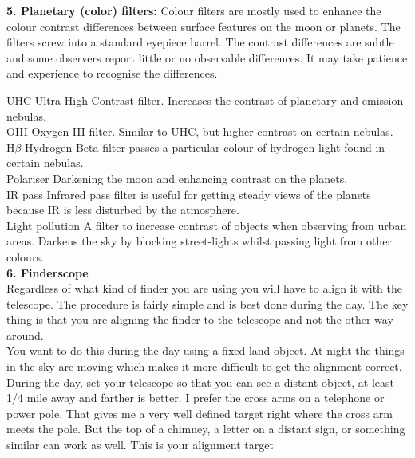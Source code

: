 \documentclass[a4paper,12pt]{extarticle}
\begin{document}
\textsf{\textbf{5. Planetary (color) filters:}} Colour filters are mostly used to enhance the colour contrast differences between surface features on the moon or planets. The filters screw into a standard eyepiece barrel. The contrast differences are subtle and some observers report little or no observable differences. It may take patience and experience to recognise the differences.

{\color{blue} UHC} \quad Ultra High Contrast filter. Increases the contrast of planetary and emission nebulas.\\
{\color{blue} OIII} \quad Oxygen-III filter. Similar to UHC, but higher contrast on certain nebulas.\\
{\color{blue} H$\beta$} \quad Hydrogen Beta filter passes a particular colour of hydrogen light found in certain nebulas.\\
{\color{blue} Polariser} \quad Darkening the moon and enhancing contrast on the planets.\\
{\color{blue} IR pass} \quad Infrared pass filter is useful for getting steady views of the planets because IR is less disturbed by the atmosphere.\\
{\color{blue} Light pollution} \quad A filter to increase contrast of objects when observing from
urban areas. Darkens the sky by blocking street-lights whilst passing light from other colours.\\

\textbf{6. Finderscope}\\

Regardless of what kind of finder you are using you will have to align it with the telescope. The procedure is fairly simple and is best done during the day. The key thing is that you are aligning the finder to the telescope and not the other way around.\\

You want to do this during the day using a fixed land object. At night the things in the sky are moving which makes it more difficult to get the alignment correct.\\

During the day, set your telescope so that you can see a distant object, at least 1/4 mile away and farther is better. I prefer the cross arms on a telephone or power pole. That gives me a very well defined target right where the cross arm meets the pole. But the top of a chimney, a letter on a distant sign, or something similar can work as well. This is your alignment target\\
\end{document}
